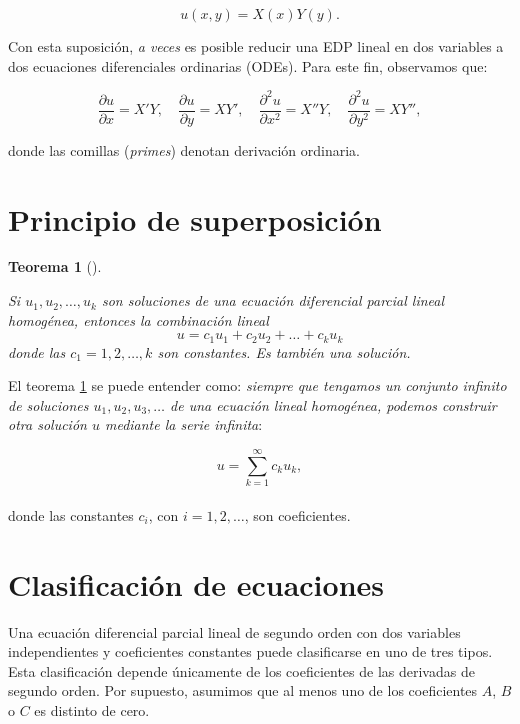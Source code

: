 \documentclass[
  spanish,
  us-letterpaper,
  DIV=11,
  numbers=noendperiod]{scrreprt}
\theoremstyle{definition}
\theoremstyle{plain}
\newtheorem{theorem}{Teorema}[chapter]
\theoremstyle{remark}
\begin{document}
\[
u(x, y) = X(x)Y(y).
\]

Con esta suposición, \emph{a veces} es posible reducir una EDP lineal en
dos variables a dos ecuaciones diferenciales ordinarias (ODEs). Para
este fin, observamos que:

\[
\dfrac{\partial u}{\partial x} = X'Y, \quad
\dfrac{\partial u}{\partial y} = XY', \quad
\dfrac{\partial^2 u}{\partial x^2} = X''Y, \quad
\dfrac{\partial^2 u}{\partial y^2} = XY'',
\]

donde las comillas (\emph{primes}) denotan derivación ordinaria.

\section{Principio de
superposición}\label{principio-de-superposiciuxf3n}

\begin{theorem}[]\protect\hypertarget{thm-superposition}{}\label{thm-superposition}

Si \(u_1 , u_2 , \dots , u_k\) son soluciones de una ecuación
diferencial parcial lineal homogénea, entonces la combinación lineal \[
u = c_1u_1 + c_2u_2 + \dots + c_ku_k
\] donde las \(c_1=1,2,\dots,k\) son constantes. Es también una
solución.

\end{theorem}

El teorema \ref{thm-superposition} se puede entender como: \emph{siempre
que tengamos un conjunto infinito de soluciones
\(u_1, u_2, u_3, \ldots\) de una ecuación lineal homogénea, podemos
construir otra solución \(u\) mediante la serie infinita}:

\[  
u = \sum_{k=1}^{\infty} c_k u_k,  
\]\\
donde las constantes \(c_i\), con \(i = 1, 2, \ldots\), son
coeficientes.

\section{Clasificación de
ecuaciones}\label{clasificaciuxf3n-de-ecuaciones}

Una ecuación diferencial parcial lineal de segundo orden con dos
variables independientes y coeficientes constantes puede clasificarse en
uno de tres tipos. Esta clasificación depende únicamente de los
coeficientes de las derivadas de segundo orden. Por supuesto, asumimos
que al menos uno de los coeficientes \(A\), \(B\) o \(C\) es distinto de
cero.
\end{document}
